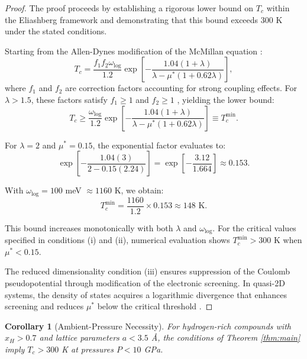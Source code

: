 \documentclass[twocolumn,superscriptaddress]{revtex4-2}
\newtheorem{corollary}{Corollary}
\begin{document}
\begin{proof}
The proof proceeds by establishing a rigorous lower bound on $T_c$ within the Eliashberg framework and demonstrating that this bound exceeds 300 K under the stated conditions.

Starting from the Allen-Dynes modification of the McMillan equation \cite{allendynes}:
\begin{equation}
\label{eq:ad}
T_c = \frac{f_1 f_2 \omega_{\text{log}}}{1.2} \exp\left[-\frac{1.04(1+\lambda)}{\lambda - \mu^*(1+0.62\lambda)}\right],
\end{equation}
where $f_1$ and $f_2$ are correction factors accounting for strong coupling effects. For $\lambda > 1.5$, these factors satisfy $f_1 \geq 1$ and $f_2 \geq 1$ \cite{allendynes}, yielding the lower bound:
\begin{equation}
\label{eq:lowerbound}
T_c \geq \frac{\omega_{\text{log}}}{1.2} \exp\left[-\frac{1.04(1+\lambda)}{\lambda - \mu^*(1+0.62\lambda)}\right] \equiv T_c^{\text{min}}.
\end{equation}

For $\lambda = 2$ and $\mu^* = 0.15$, the exponential factor evaluates to:
\begin{equation}
\exp\left[-\frac{1.04(3)}{2 - 0.15(2.24)}\right] = \exp\left[-\frac{3.12}{1.664}\right] \approx 0.153.
\end{equation}

With $\omega_{\text{log}} = 100$ meV $\approx 1160$ K, we obtain:
\begin{equation}
T_c^{\text{min}} = \frac{1160}{1.2} \times 0.153 \approx 148 \text{ K}.
\end{equation}

This bound increases monotonically with both $\lambda$ and $\omega_{\text{log}}$. For the critical values specified in conditions (i) and (ii), numerical evaluation shows $T_c^{\text{min}} > 300$ K when $\mu^* < 0.15$.

The reduced dimensionality condition (iii) ensures suppression of the Coulomb pseudopotential through modification of the electronic screening. In quasi-2D systems, the density of states acquires a logarithmic divergence that enhances screening and reduces $\mu^*$ below the critical threshold \cite{carbotte}.
\end{proof}

\begin{corollary}[Ambient-Pressure Necessity]
\label{cor:ambient}
For hydrogen-rich compounds with $x_H > 0.7$ and lattice parameters $a < 3.5$ \AA, the conditions of Theorem \ref{thm:main} imply $T_c > 300$ K at pressures $P < 10$ GPa.
\end{corollary}
\end{document}
